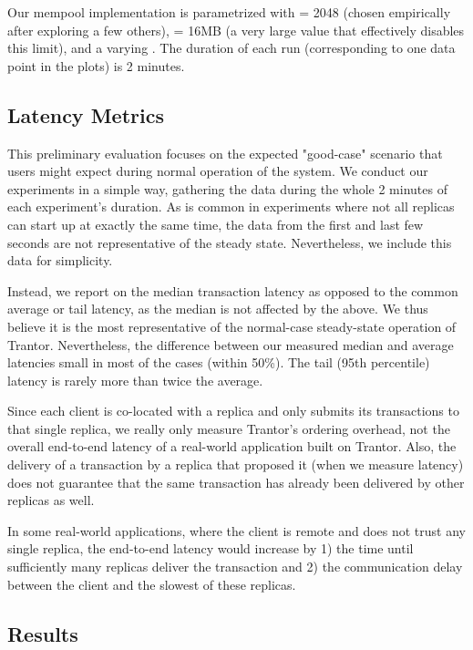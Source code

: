\documentclass{article}
\begin{document}
Our mempool implementation is parametrized with  = 2048 (chosen empirically after exploring a few others),
 = 16MB (a very large value that effectively disables this limit), and a varying .
The duration of each run (corresponding to one data point in the plots) is 2 minutes.

\subsection{Latency Metrics}

This preliminary evaluation focuses on the expected "good-case" scenario that users might expect during normal operation of the system.
We conduct our experiments in a simple way, gathering the data during the whole 2 minutes of each experiment's duration.
As is common in experiments where not all replicas can start up at exactly the same time,
the data from the first and last few seconds are not representative of the steady state.
Nevertheless, we include this data for simplicity.

Instead, we report on the median transaction latency as opposed to the common average or tail latency, as the median is not affected by the above.
We thus believe it is the most representative of the normal-case steady-state operation of Trantor.
Nevertheless, the difference between our measured median and average latencies small in most of the cases (within 50\%).
The tail (95th percentile) latency is rarely more than twice the average.

Since each client is co-located with a replica and only submits its transactions to that single replica,
we really only measure Trantor's ordering overhead, not the overall end-to-end latency of a real-world application built on Trantor.
Also, the delivery of a transaction by a replica that proposed it (when we measure latency)
does not guarantee that the same transaction has already been delivered by other replicas as well.

In some real-world applications, where the client is remote and does not trust any single replica,
the end-to-end latency would increase by
1) the time until sufficiently many replicas deliver the transaction and
2) the communication delay between the client and the slowest of these replicas.

\subsection{Results}
\end{document}
